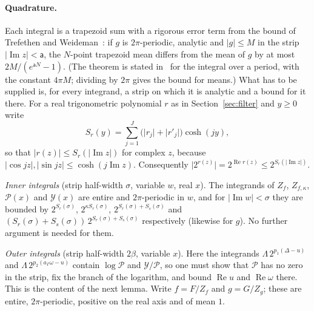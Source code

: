 \documentclass[11pt]{article}
\theoremstyle{definition}
\newcommand{\abs}[1]{\lvert #1\rvert}
\begin{document}
\paragraph{Quadrature.} Each integral is a trapezoid sum with a rigorous error term
from the bound of Trefethen and Weideman~\cite[Theorem~3.2]{TW}: if $g$ is $2\pi$-periodic, analytic and
$\abs g\le M$ in the strip
$\abs{\operatorname{Im}z}<\mathsf a$, the $N$-point trapezoid mean differs from the mean of $g$ by at most
$2M/(e^{\mathsf aN}-1)$. (The theorem is stated in~\cite{TW} for the integral over a period, with the constant
$4\pi M$; dividing by $2\pi$ gives the bound for means.) What has to be supplied is, for every integrand, a strip
on which it is analytic and a bound for it there. For a real trigonometric polynomial $r$ as in
Section~\ref{sec:filter} and $y\ge0$ write
\[
 S_r(y)=\sum_{j=1}^{J}\bigl(\abs{r_j}+\abs{r'_j}\bigr)\cosh(jy),
\]
so that $\abs{r(z)}\le S_r(\abs{\operatorname{Im}z})$ for complex $z$, because
$\abs{\cos jz},\abs{\sin jz}\le\cosh(j\operatorname{Im}z)$. Consequently $\abs{2^{r(z)}}=2^{\operatorname{Re}r(z)}\le2^{S_r(\abs{\operatorname{Im}z})}$.

\emph{Inner integrals} (strip half-width $\sigma$, variable $w$, real $x$). The integrands of $Z_f$, $Z_{f,\kappa}$,
$\mathcal P(x)$ and $\mathcal Y(x)$ are entire and $2\pi$-periodic in $w$, and for $\abs{\operatorname{Im}w}<\sigma$
they are bounded by $2^{S_r(\sigma)}$, $2^{\kappa S_r(\sigma)}$, $2^{S_r(\sigma)+S_s(\sigma)}$ and
$(S_r(\sigma)+S_s(\sigma))\,2^{S_r(\sigma)+S_s(\sigma)}$ respectively (likewise for $g$). No further argument is
needed for them.

\emph{Outer integrals} (strip half-width $2\beta$, variable $x$). Here the integrands
$\Lambda\,2^{p_1(\Delta-u)}$ and $\Lambda\,2^{p_2(a_\Gamma\omega-u)}$ contain $\log\mathcal P$ and
$\mathcal Y/\mathcal P$, so one must show that $\mathcal P$ has no zero in the strip, fix the branch of the
logarithm, and bound $\operatorname{Re}u$ and $\operatorname{Re}\omega$ there. This is the content of the next
lemma. Write $f=F/Z_f$ and $g=G/Z_g$; these are entire, $2\pi$-periodic, positive on the real axis and of mean
$1$.
\end{document}
